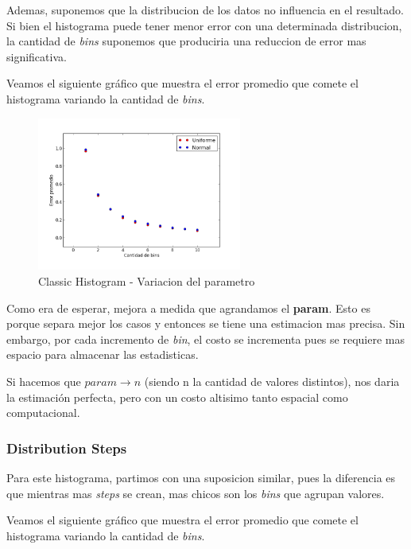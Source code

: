 \documentclass[10pt, a4paper,english,spanish,hidelinks]{article}
\begin{document}
Ademas, suponemos que la distribucion de los datos no influencia en el resultado. Si bien
el histograma puede tener menor error con una determinada distribucion, la cantidad de
\textit{bins} suponemos que produciria una reduccion de error mas significativa.

Veamos el siguiente gráfico que muestra el error promedio que comete el histograma variando
la cantidad de \textit{bins}.

\begin{figure}[h!]
  \centering
  \includegraphics[width=0.6\textwidth]{./imagenes/ejb2_classic_parameter_variation.png}
  \caption{Classic Histogram - Variacion del parametro}
\end{figure}


Como era de esperar, mejora a medida que agrandamos el \textbf{param}.
Esto es porque separa mejor los casos y entonces se tiene una estimacion mas precisa.
Sin embargo, por cada incremento de \textit{bin}, el costo se incrementa pues se requiere
mas espacio para almacenar las estadisticas.

Si hacemos que $param \rightarrow n$ (siendo n la cantidad de valores distintos), nos
daria la estimación perfecta, pero con un costo altisimo tanto espacial como computacional.



\subsubsection{Distribution Steps}

Para este histograma, partimos con una suposicion similar, pues la diferencia es que mientras
mas \textit{steps} se crean, mas chicos son los \textit{bins} que agrupan valores.


Veamos el siguiente gráfico que muestra el error promedio que comete el histograma variando
la cantidad de \textit{bins}.
\end{document}
